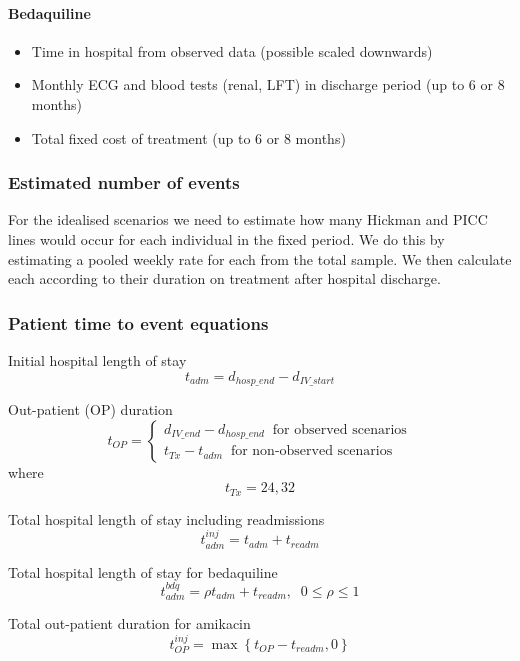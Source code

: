 \documentclass[]{article}
\providecommand{\tightlist}{%
  \setlength{\itemsep}{0pt}\setlength{\parskip}{0pt}}
\let\oldparagraph\paragraph
\renewcommand{\paragraph}[1]{\oldparagraph{#1}\mbox{}}
\begin{document}
\hypertarget{bedaquiline}{%
\paragraph{Bedaquiline}\label{bedaquiline}}

\begin{itemize}
\tightlist
\item
  Time in hospital from observed data (possible scaled downwards)
\item
  Monthly ECG and blood tests (renal, LFT) in discharge period (up to 6
  or 8 months)
\item
  Total fixed cost of treatment (up to 6 or 8 months)
\end{itemize}

\hypertarget{estimated-number-of-events}{%
\subsubsection{Estimated number of
events}\label{estimated-number-of-events}}

For the idealised scenarios we need to estimate how many Hickman and
PICC lines would occur for each individual in the fixed period. We do
this by estimating a pooled weekly rate for each from the total sample.
We then calculate each according to their duration on treatment after
hospital discharge.

\hypertarget{patient-time-to-event-equations}{%
\subsubsection{Patient time to event
equations}\label{patient-time-to-event-equations}}

Initial hospital length of stay \[
t_{adm}=d_{hosp\_end}-d_{IV\_start}
\]

Out-patient (OP) duration \[
t_{OP}= \left\{
\begin{array}{ll}
d_{IV\_end}-d_{hosp\_end} \;\; \text{for observed scenarios}\\
t_{Tx} - t_{adm} \;\; \text{for non-observed scenarios}
\end{array}
\right.
\] where \[
t_{Tx} = 24, 32
\]

Total hospital length of stay including readmissions \[
t_{adm}^{inj}=t_{adm}+t_{readm}
\]

Total hospital length of stay for bedaquiline \[
t_{adm}^{bdq}=\rho t_{adm}+t_{readm}, \; \; 0\le\rho\le1
\]

Total out-patient duration for amikacin \[
t_{OP}^{inj}=\max{\left\{t_{OP}-t_{readm}, 0\right\}}
\]
\end{document}
